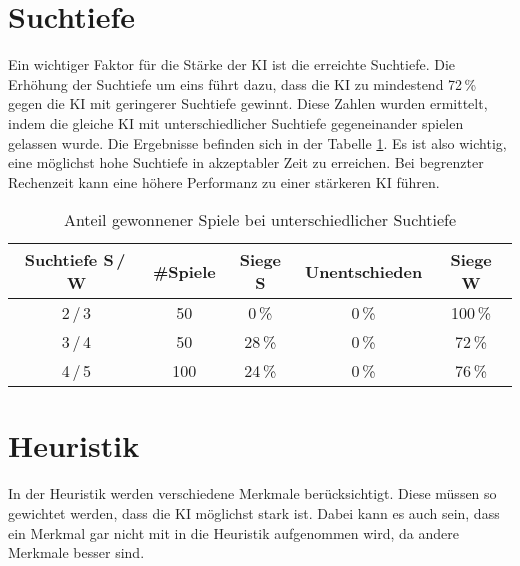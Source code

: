 
\section{Suchtiefe}
Ein wichtiger Faktor für die Stärke der KI ist die erreichte Suchtiefe. Die Erhöhung der Suchtiefe um eins führt dazu,
dass die KI zu mindestend 72\,\% gegen die KI mit geringerer Suchtiefe gewinnt. Diese Zahlen wurden ermittelt, indem die
gleiche KI mit unterschiedlicher Suchtiefe gegeneinander spielen gelassen wurde. Die Ergebnisse befinden sich in der
Tabelle \ref{table:search-depth}. Es ist also wichtig, eine möglichst hohe Suchtiefe in akzeptabler Zeit zu erreichen.
Bei begrenzter Rechenzeit kann eine höhere Performanz zu einer stärkeren KI führen.

\begin{table}[hb]
\centering
\begin{tabular}{c|c|ccc}
\hline
Suchtiefe S\,/\,W & \#Spiele & Siege S & Unentschieden & Siege W
\\ \hline
2\,/\,3 & 50 &  0\,\% &  0\,\% & 100\,\% \\
3\,/\,4 & 50 & 28\,\% &  0\,\% & 72\,\% \\
4\,/\,5 &100 & 24\,\% &  0\,\% & 76\,\% \\
\hline
\end{tabular}
\caption{Anteil gewonnener Spiele bei unterschiedlicher Suchtiefe}
\label{table:search-depth}
\end{table}

\section{Heuristik}
In der Heuristik werden verschiedene Merkmale berücksichtigt. Diese müssen so gewichtet werden, dass die KI möglichst
stark ist. Dabei kann es auch sein, dass ein Merkmal gar nicht mit in die Heuristik aufgenommen wird, da andere Merkmale
besser sind.


